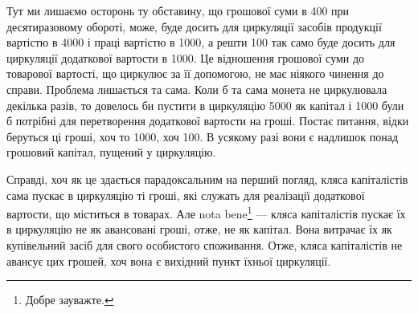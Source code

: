 
Тут ми лишаємо осторонь ту обставину, що грошової суми в 400 при десятиразовому обороті, може, буде досить для циркуляції
засобів продукції вартістю в 4000 і праці вартістю в 1000, а решти 100 так само буде досить для циркуляції додаткової
вартости в 1000. Це відношення грошової суми до товарової
вартості, що циркулює за її допомогою, не має ніякого чинення до
справи. Проблема лишається та сама. Коли б та сама монета не циркулювала
декілька разів, то довелось би пустити в циркуляцію 5000
як капітал і 1000 були б потрібні для перетворення додаткової
вартости на гроші. Постає питання, відки беруться ці гроші, хоч то
1000, хоч 100. В усякому разі вони є надлишок понад
грошовий капітал, пущений у циркуляцію.

Справді, хоч як це здається парадоксальним на перший погляд, кляса
капіталістів сама пускає в циркуляцію ті гроші, які служать для реалізації
додаткової вартости, що міститься в товарах. Але nota bene\footnote*{
Добре зауважте. 
} — кляса
капіталістів пускає їх в циркуляцію не як авансовані гроші, отже, не як
капітал. Вона витрачає їх як купівельний засіб для свого особистого
споживання. Отже, кляса капіталістів не авансує цих грошей, хоч вона
є вихідний пункт їхньої циркуляції.

